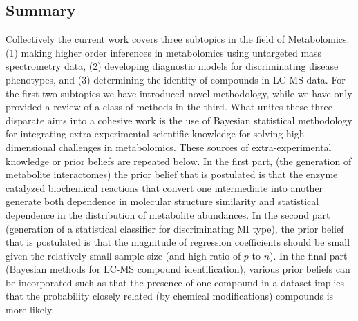\label{conclusions}
\begin{DoubleSpace*}
\section{Summary}
Collectively the current work covers three subtopics in the field of Metabolomics: (1) making higher order inferences in metabolomics using untargeted mass spectrometry data, (2) developing diagnostic models for discriminating disease phenotypes, and (3) determining the identity of compounds in LC-MS data. For the first two subtopics we have introduced novel methodology, while we have only provided a review of a class of methods in the third. What unites these three disparate aims into a cohesive work is the use of Bayesian statistical methodology for integrating extra-experimental scientific knowledge for solving high-dimensional challenges in metabolomics. These sources of extra-experimental knowledge or prior beliefs are repeated below. In the first part, (the generation of metabolite interactomes) the prior belief that is postulated is that the enzyme catalyzed biochemical reactions that convert one intermediate into another generate both dependence in molecular structure similarity and statistical dependence in the distribution of metabolite abundances. In the second part (generation of a statistical classifier for discriminating MI type), the prior belief that is postulated is that the magnitude of regression coefficients should be small given the relatively small sample size (and high ratio of $p$ to $n$). In the final part (Bayesian methods for LC-MS compound identification), various prior beliefs can be incorporated such as that the presence of one compound in a dataset implies that the probability closely related (by chemical modifications) compounds is more likely. 


\end{DoubleSpace*}
